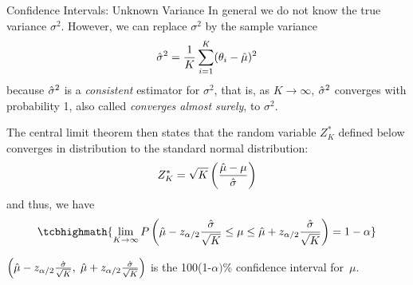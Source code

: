\begin{frame}{Confidence Intervals: Unknown Variance}
In general we do not know the 
  true variance
$\sigma^2$. However, we can replace $\sigma^2$ by
the sample variance
\begin{align*}
  \hat{\sigma}^2 = {1 \over K} \sum_{i=1}^K (\theta_i - \hat{\mu})^2
\end{align*}
because $\hat{\sigma}^2$ is a {\em consistent} estimator for
$\sigma^2$, that is, as $K\to\infty$, $\hat{\sigma}^2$ converges with
probability 1, also called {\em converges almost surely}, to
$\sigma^2$. 

\medskip
The central limit theorem then states that the random
variable $Z_K^*$ def\/{i}ned below converges in distribution to the
standard normal distribution:
\begin{align*}
  Z_K^* = \sqrt{K} \left({\hat{\mu} - \mu \over \hat{\sigma}}\right)
\end{align*}
and thus, we have
\begin{align*}
\tcbhighmath{
  \lim_{K\to\infty} P\lB(\hmu - z_{\alpha/2}{\hsigma \over \sqrt{K}} \le \mu \le
  \hmu + z_{\alpha/2}{\hsigma \over \sqrt{K}} \rB) = 1-\alpha
}
\end{align*}

\medskip
$\left(\hat{\mu} - z_{\alpha/2}{\hat{\sigma} \over \sqrt{K}},\;
  \hat{\mu} + z_{\alpha/2}{\hat{\sigma} \over \sqrt{K}} \right)$ is the 100(1-$\alpha)\%$
  conf\/{i}dence interval for~$\mu$.
\end{frame}




